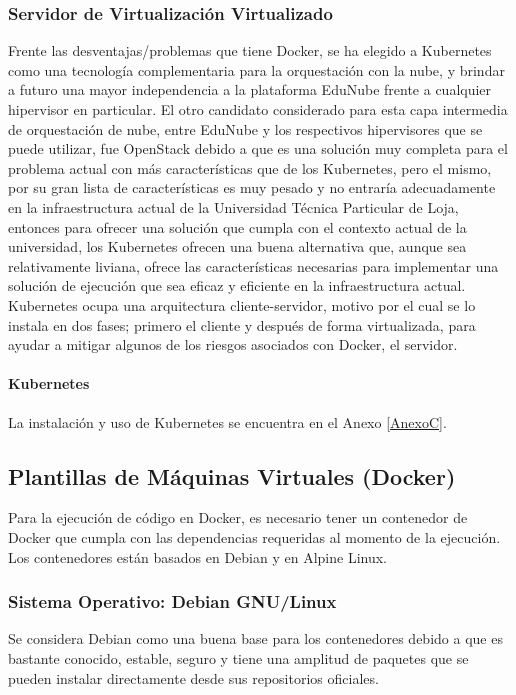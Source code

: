 \subsubsection{Servidor de Virtualización Virtualizado}
Frente las desventajas/problemas que tiene Docker, se ha elegido a Kubernetes como una tecnología complementaria para la orquestación con la nube, y brindar a futuro una mayor independencia a la plataforma EduNube frente a cualquier hipervisor en particular. El otro candidato considerado para esta capa intermedia de orquestación de nube, entre EduNube y los respectivos hipervisores que se puede utilizar, fue OpenStack debido a que es una solución muy completa para el problema actual con más características que de los Kubernetes, pero el mismo, por su gran lista de características es muy pesado y no entraría adecuadamente en la infraestructura actual de la Universidad Técnica Particular de Loja, entonces para ofrecer una solución que cumpla con el contexto actual de la universidad, los Kubernetes ofrecen una buena alternativa que, aunque sea relativamente liviana, ofrece las características necesarias para implementar una solución de ejecución que sea eficaz y eficiente en la infraestructura actual. Kubernetes ocupa una arquitectura cliente-servidor, motivo por el cual se lo instala en dos fases; primero el cliente y después de forma virtualizada, para ayudar a mitigar algunos de los riesgos asociados con Docker, el servidor. 

\paragraph{Kubernetes}
La instalación y uso de Kubernetes se encuentra en el Anexo \ref{AnexoC}.

\subsection{Plantillas de Máquinas Virtuales (Docker)}
Para la ejecución de código en Docker, es necesario tener un contenedor de Docker que cumpla con las dependencias requeridas al momento de la ejecución. Los contenedores están basados en Debian y en Alpine Linux.

\subsubsection{Sistema Operativo: Debian GNU/Linux}
Se considera Debian como una buena base para los contenedores debido a que es bastante conocido, estable, seguro y tiene una amplitud de paquetes que se pueden instalar directamente desde sus repositorios oficiales.

